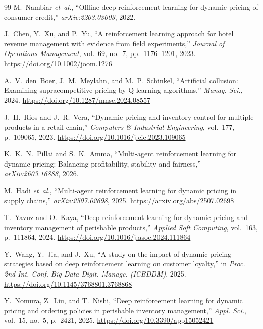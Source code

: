 \documentclass[journal, 10pt, twoside]{IEEEtran}
\begin{document}
\begin{thebibliography}{99}
M.~Nambiar \textit{et~al.},
``Offline deep reinforcement learning for dynamic pricing of consumer
credit,''
\textit{arXiv:2203.03003}, 2022.

J.~Chen, Y.~Xu, and P.~Yu,
``A reinforcement learning approach for hotel revenue management with
evidence from field experiments,''
\textit{Journal of Operations Management}, vol.~69, no.~7,
pp.~1176--1201, 2023.
\url{https://doi.org/10.1002/joom.1276}

A.~V.~den~Boer, J.~M.~Meylahn, and M.~P.~Schinkel,
``Artificial collusion: Examining supracompetitive pricing by Q-learning
algorithms,''
\textit{Manag. Sci.}, 2024.
\url{https://doi.org/10.1287/mnsc.2024.08557}

J.~H.~Rios and J.~R.~Vera,
``Dynamic pricing and inventory control for multiple products in a
retail chain,''
\textit{Computers \& Industrial Engineering}, vol.~177, p.~109065, 2023.
\url{https://doi.org/10.1016/j.cie.2023.109065}

K.~K.~N.~Pillai and S.~K.~Amma,
``Multi-agent reinforcement learning for dynamic pricing: Balancing
profitability, stability and fairness,''
\textit{arXiv:2603.16888}, 2026.

M.~Hadi \textit{et~al.},
``Multi-agent reinforcement learning for dynamic pricing in supply
chains,''
\textit{arXiv:2507.02698}, 2025.
\url{https://arxiv.org/abs/2507.02698}

T.~Yavuz and O.~Kaya,
``Deep reinforcement learning for dynamic pricing and inventory
management of perishable products,''
\textit{Applied Soft Computing}, vol.~163, p.~111864, 2024.
\url{https://doi.org/10.1016/j.asoc.2024.111864}

Y.~Wang, Y.~Jia, and J.~Xu,
``A study on the impact of dynamic pricing strategies based on deep
reinforcement learning on customer loyalty,''
in \textit{Proc. 2nd Int. Conf. Big Data Digit. Manage. (ICBDDM)}, 2025.
\url{https://doi.org/10.1145/3768801.3768868}

Y.~Nomura, Z.~Liu, and T.~Nishi,
``Deep reinforcement learning for dynamic pricing and ordering policies
in perishable inventory management,''
\textit{Appl. Sci.}, vol.~15, no.~5, p.~2421, 2025.
\url{https://doi.org/10.3390/app15052421}

\end{thebibliography}
\end{document}
